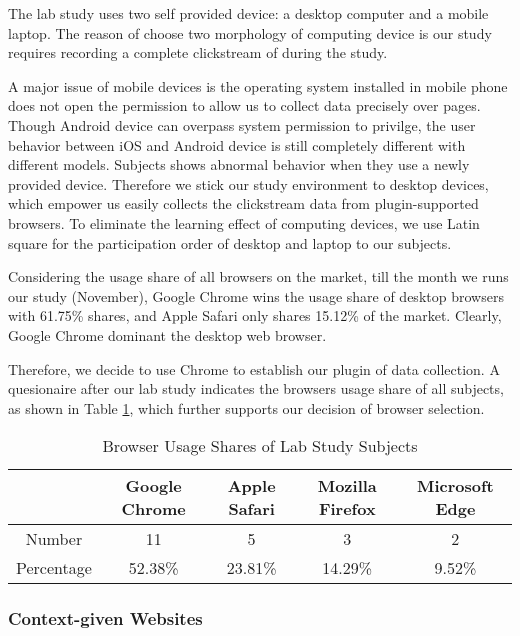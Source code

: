 The lab study uses two self provided device: a desktop computer and a mobile laptop.
The reason of choose two morphology of computing device is our study requires recording
a complete clickstream of during the study.

A major issue of mobile devices is the operating system installed in mobile phone does not
open the permission to allow us to collect data precisely over pages. Though Android device
can overpass system permission to privilge, the user behavior between iOS and Android device
is still completely different with different models. Subjects shows abnormal behavior when they
use a newly provided device. Therefore we stick our study environment to desktop devices, 
which empower us easily collects the clickstream data from plugin-supported browsers.
To eliminate the learning effect of computing devices, we use Latin square \cite{cochran1950experimental} 
for the participation order of desktop and laptop to our subjects.

Considering the usage share of all browsers on the market, till the month we runs our study (November),
Google Chrome wins the usage share of desktop browsers with 61.75\% shares, and Apple Safari only shares
15.12\% of the market. Clearly, Google Chrome dominant the desktop web browser. 

Therefore, we decide to use Chrome to establish our plugin of data collection.
A quesionaire after our lab study indicates the browsers usage share of all subjects, 
as shown in Table \ref{table:sharesubjects}, which further supports our decision of 
browser selection.

\begin{table}[H]
    \small
    \centering
    \setlength{\belowcaptionskip}{10pt}
    \caption{Browser Usage Shares of Lab Study Subjects}
    \begin{tabular}{ccccc}
          \toprule
        & \textbf{Google Chrome} & \textbf{Apple Safari} & \textbf{Mozilla Firefox} & \textbf{Microsoft Edge} \\
          \hline
          Number     & 11 & 5 & 3 & 2 \\
          Percentage & 52.38\% & 23.81\% & 14.29\% & 9.52\% \\
          \bottomrule
    \end{tabular}
    \label{table:sharesubjects}
\end{table}

\subsubsection{Context-given Websites}

